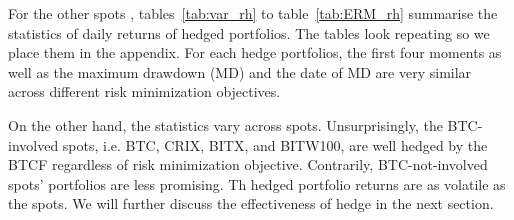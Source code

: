 For the other spots , tables~\ref{tab:var_rh} to table~\ref{tab:ERM_rh} summarise the statistics
of daily returns of hedged portfolios.    
The tables look repeating so we place them in the appendix. 
For each hedge portfolios,
the first four moments as well as the maximum drawdown (MD) and the date of MD are very similar across different risk minimization objectives. 

On the other hand, the statistics vary across spots.
Unsurprisingly, the BTC-involved spots, i.e. BTC, CRIX, BITX, and BITW100, are well hedged by the BTCF regardless of risk minimization objective.
Contrarily, BTC-not-involved spots' portfolios are less promising.
Th hedged portfolio returns are as volatile as the spots. 
We will further discuss the effectiveness of hedge in the next section. %


